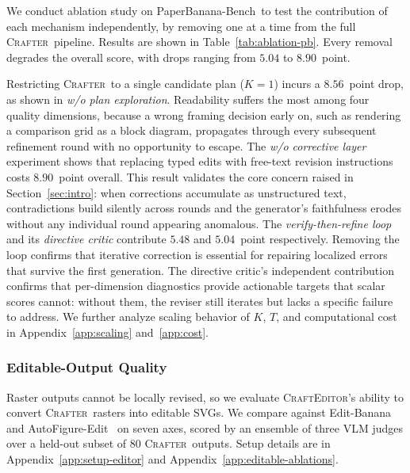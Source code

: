 \documentclass{llmxive}
\providecommand{\Crafter}{\textsc{Crafter}\xspace}
\providecommand{\Editor}{\textsc{CraftEditor}\xspace}
\providecommand{\PaperBananaBench}{PaperBanana-Bench\xspace}
\begin{document}
We conduct ablation study on \PaperBananaBench\ to test the contribution of each mechanism independently, by removing one at a time from the full \Crafter\ pipeline. Results are shown in Table~\ref{tab:ablation-pb}. Every removal degrades the overall score, with drops ranging from $5.04$ to $8.90$~point.

Restricting \Crafter\ to a single candidate plan ($K{=}1$) incurs a $8.56$~point drop, as shown in \textit{w/o plan exploration}. Readability suffers the most among four quality dimensions, because a wrong framing decision early on, such as rendering a comparison grid as a block diagram, propagates through every subsequent refinement round with no opportunity to escape.
The \textit{w/o corrective layer} experiment shows that replacing typed edits with free-text revision instructions costs $8.90$~point overall. This result validates the core concern raised in Section~\ref{sec:intro}: when corrections accumulate as unstructured text, contradictions build silently across rounds and the generator's faithfulness erodes without any individual round appearing anomalous.
The \textit{verify-then-refine loop} and its \textit{directive critic} contribute $5.48$ and $5.04$~point respectively. Removing the loop confirms that iterative correction is essential for repairing localized errors that survive the first generation. The directive critic's independent contribution confirms that per-dimension diagnostics provide actionable targets that scalar scores cannot: without them, the reviser still iterates but lacks a specific failure to address.
We further analyze scaling behavior of $K$, $T$, and computational cost in Appendix~\ref{app:scaling} and~\ref{app:cost}.




\subsubsection{Editable-Output Quality}
\label{sec:exp-editable}

Raster outputs cannot be locally revised, so we evaluate \Editor's ability to convert \Crafter\ rasters into editable SVGs. We compare against Edit-Banana~\citep{editbanana2026} and AutoFigure-Edit~\citep{lin2026autofigureedit} on seven axes, scored by an ensemble of three VLM judges over a held-out subset of $80$ \Crafter\ outputs. Setup details are in Appendix~\ref{app:setup-editor} and Appendix~\ref{app:editable-ablations}.
\end{document}

